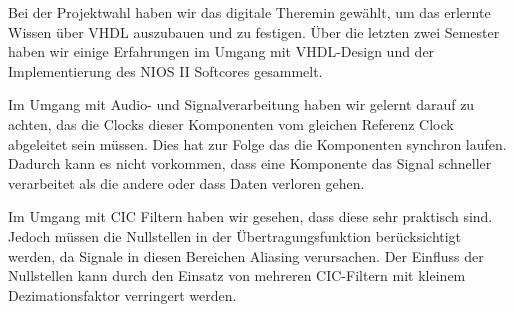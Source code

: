 Bei der Projektwahl haben wir das digitale Theremin gewählt, um das erlernte Wissen über VHDL auszubauen und zu festigen. Über die letzten zwei Semester haben wir einige Erfahrungen im Umgang mit VHDL-Design und der Implementierung des NIOS II Softcores gesammelt.

Im Umgang mit Audio- und Signalverarbeitung haben wir gelernt darauf zu achten, das die Clocks dieser Komponenten vom gleichen Referenz Clock abgeleitet sein müssen. Dies hat zur Folge das die Komponenten synchron laufen. Dadurch kann es nicht vorkommen, dass eine Komponente das Signal schneller verarbeitet als die andere oder dass Daten verloren gehen. 

Im Umgang mit CIC Filtern haben wir gesehen, dass diese sehr praktisch sind. Jedoch müssen die Nullstellen in der Übertragungsfunktion berücksichtigt werden, da Signale in diesen Bereichen Aliasing verursachen. Der Einfluss der Nullstellen kann durch den Einsatz von mehreren CIC-Filtern mit kleinem Dezimationsfaktor verringert werden.

